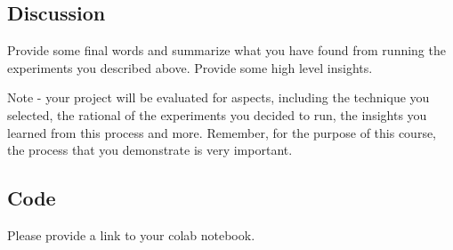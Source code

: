 \documentclass{article}
\begin{document}
\begin{multicols}{2}
\subsection{Discussion}
Provide some final words and summarize what you have found from running the experiments you described above. Provide some high level insights.

Note - your project will be evaluated for aspects, including the technique you selected, the rational of the experiments you decided to run, the insights you learned from this process and more. Remember, for the purpose of this course, the process that you demonstrate is very  important.

\subsection{Code}

Please provide a link to your colab notebook.

\end{multicols}
\end{document}

